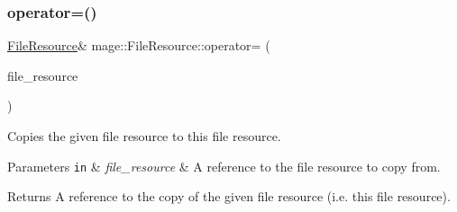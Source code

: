 \subsubsection{\texorpdfstring{operator=()}{operator=()}\hspace{0.1cm}{\footnotesize\ttfamily [2/2]}}
{\footnotesize\ttfamily \hyperlink{classmage_1_1_file_resource}{File\+Resource}\& mage\+::\+File\+Resource\+::operator= (\begin{DoxyParamCaption}\item[{\hyperlink{classmage_1_1_file_resource}{File\+Resource} \&\&}]{file\+\_\+resource }\end{DoxyParamCaption})\hspace{0.3cm}{\ttfamily [delete]}}

Copies the given file resource to this file resource.


\begin{DoxyParams}[1]{Parameters}
\mbox{\tt in}  & {\em file\+\_\+resource} & A reference to the file resource to copy from. \\
\hline
\end{DoxyParams}
\begin{DoxyReturn}{Returns}
A reference to the copy of the given file resource (i.\+e. this file resource). 
\end{DoxyReturn}
